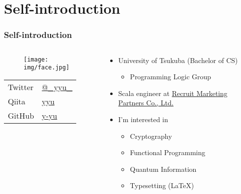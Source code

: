 \section{Self-introduction}
\begin{frame}
  \frametitle{Self-introduction}
  
  \begin{columns}
    \begin{column}{0.3\textwidth}
      \begin{center}
        \begin{figure}
          \texttt{[image: img/face.jpg]}
        \end{figure}
      \end{center}
 
      \begin{table}[h]
        \begin{tabular}{ll}
          Twitter & \href{https://twitter.com/\_yyu\_}{@\_yyu\_} \\
          Qiita & \href{https://qiita.com/yyu}{yyu} \\
          GitHub & \href{https://github.com/y-yu}{y-yu} \\
        \end{tabular}
      \end{table}
    \end{column}
    \begin{column}{0.7\textwidth}
      \pause
      \begin{itemize}
        \item University of Tsukuba (Bachelor of CS)
        \begin{itemize}
          \item Programming Logic Group
        \end{itemize}
        
        \item Scala engineer at
        \href{http://www.recruit-mp.co.jp/}{Recruit Marketing Partners Co., Ltd.}

        \item I'm interested in
        \begin{itemize}
          \item Cryptography
          \item Functional Programming
          \item Quantum Information
          \item Typesetting (\LaTeX)
        \end{itemize}
      \end{itemize}
    \end{column}
  \end{columns}


\end{frame}

